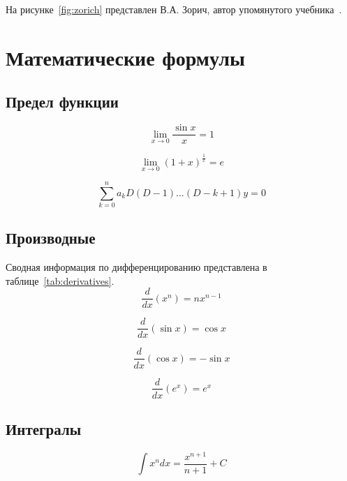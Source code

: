 \documentclass[a4paper,12pt]{article}
\begin{document}
На рисунке~\ref{fig:zorich} представлен В.А. Зорич, автор упомянутого учебника~\cite{zorich}.
\tableofcontents
\newpage

\section{Математические формулы}

\subsection{Предел функции}

\setcounter{equation}{0}
\begin{equation}
\lim_{x\to0} \frac{\sin x}{x}=1
\label{eq:sin_limit}  
\end{equation}

\begin{equation}
\lim_{x\to0} (1+x)^\frac{1}{x}=e   
\end{equation}

\begin{equation}
\sum_{k=0}^{n} a_kD(D-1)...(D-k+1)y=0 
\end{equation}

\subsection{Производные}
Сводная информация по дифференцированию представлена в таблице~\ref{tab:derivatives}.
\setcounter{equation}{0}
\begin{equation}
\frac{d}{dx}(x^n) = nx^{n-1}
\end{equation}

\begin{equation}
\frac{d}{dx}(\sin x) = \cos x
\end{equation}

\begin{equation}
\frac{d}{dx}(\cos x) = -\sin x
\end{equation}

\begin{equation}
\frac{d}{dx}(e^x) = e^x
\end{equation}

\subsection{Интегралы}
\setcounter{equation}{0}

\begin{equation}
\int x^n dx = \frac{x^{n+1}}{n+1} + C
\end{equation}
\end{document}

